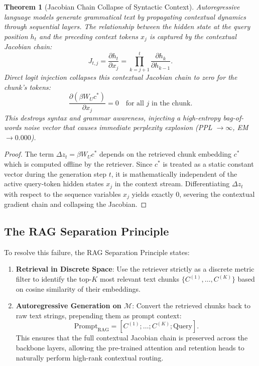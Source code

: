 \documentclass[11pt]{article}
\newtheorem{theorem}{Theorem}[section]
\begin{document}
\begin{theorem}[Jacobian Chain Collapse of Syntactic Context]
Autoregressive language models generate grammatical text by propagating contextual dynamics through sequential layers. The relationship between the hidden state at the query position $h_t$ and the preceding context tokens $x_{j}$ is captured by the contextual Jacobian chain:
\begin{equation}
J_{t, j} = \frac{\partial h_t}{\partial x_j} = \prod_{k=j+1}^t \frac{\partial h_k}{\partial h_{k-1}}.
\end{equation}
Direct logit injection collapses this contextual Jacobian chain to zero for the chunk's tokens:
\begin{equation}
\frac{\partial (\beta W_U c^*)}{\partial x_j} = 0 \quad \text{for all } j \text{ in the chunk}.
\end{equation}
This destroys syntax and grammar awareness, injecting a high-entropy bag-of-words noise vector that causes immediate perplexity explosion (PPL $\to \infty$, EM $\to 0.000$).
\end{theorem}

\begin{proof}
The term $\Delta z_t = \beta W_U c^*$ depends on the retrieved chunk embedding $c^*$ which is computed offline by the retriever. Since $c^*$ is treated as a static constant vector during the generation step $t$, it is mathematically independent of the active query-token hidden states $x_j$ in the context stream. Differentiating $\Delta z_t$ with respect to the sequence variables $x_j$ yields exactly $0$, severing the contextual gradient chain and collapsing the Jacobian.
\end{proof}

\subsection{The RAG Separation Principle}

To resolve this failure, the RAG Separation Principle states:
\begin{enumerate}
    \item \textbf{Retrieval in Discrete Space}: Use the retriever strictly as a discrete metric filter to identify the top-$K$ most relevant text chunks $\{C^{(1)}, \ldots, C^{(K)}\}$ based on cosine similarity of their embeddings.
    \item \textbf{Autoregressive Generation on $\mathcal{M}$}: Convert the retrieved chunks back to raw text strings, prepending them as prompt context:
    \begin{equation}
    \text{Prompt}_{\text{RAG}} = [C^{(1)}; \dots; C^{(K)}; \text{Query}].
    \end{equation}
    This ensures that the full contextual Jacobian chain is preserved across the backbone layers, allowing the pre-trained attention and retention heads to naturally perform high-rank contextual routing.
\end{enumerate}
\end{document}
